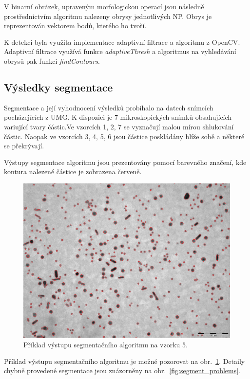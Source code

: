 \documentclass[11pt,twoside,a4paper,table]{book}
\begin{document}
V binarní obrázek, upraveným morfologickou operací jsou následně prostřednictvím algoritmu \cite{suzuki85} nalezeny obrysy jednotlivých NP. Obrys je reprezentován vektorem bodů, kterého ho tvoří.

K detekci byla využita implementace adaptivní filtrace a algoritmu \cite{suzuki85} z OpenCV\cite{opencv_library}. Adaptivní filtrace využívá funkce \textit{adaptiveThresh} a algoritmus na vyhledávání obrysů pak funkci \textit{findContours}.

\subsection{Výsledky segmentace}
Segmentace a její vyhodnocení výsledků probíhalo na datech snímcích pocházejících z UMG. K dispozici je 7 mikroskopických snímků obsahujících variující tvary částic.Ve vzorcích 1, 2, 7 se vyznačují malou mírou shlukování částic. Naopak ve vzorcích 3, 4, 5, 6 jsou částice poskládány blíže sobě a některé se překrývají.

Výstupy segmentace algoritmu jsou prezentovány pomocí barevného značení, kde kontura nalezené částice je zobrazena červeně.

\begin{figure}[ht]
	\centering
	\includegraphics[width=\textwidth]{figures/segment_result.png}	
	\caption{Příklad výstupu segmentačního algoritmu na vzorku 5.}
	\label{fig:segment_result}
\end{figure}

Příklad výstupu segmentačního algoritmu je možné pozorovat na obr.~\ref{fig:segment_result}. Detaily chybně provedené segmentace jsou znázorněny na obr.~\ref{fig:segment_problems}. 
\end{document}
